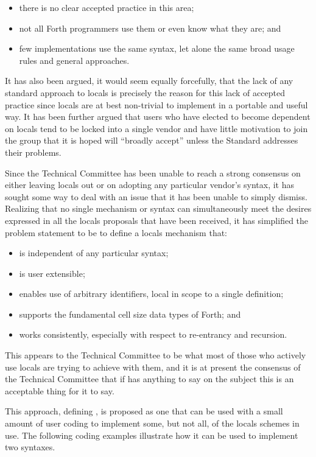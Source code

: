 \begin{itemize}
\item there is no clear accepted practice in this area;
\item not all Forth programmers use them or even know what they are;
	and
\item few implementations use the same syntax, let alone the same
	broad usage rules and general approaches.
\end{itemize}

It has also been argued, it would seem equally forcefully, that the
lack of any standard approach to locals is precisely the reason for
this lack of accepted practice since locals are at best non-trivial
to implement in a portable and useful way. It has been further argued
that users who have elected to become dependent on locals tend to be
locked into a single vendor and have little motivation to join the
group that it is hoped will ``broadly accept''  unless the
Standard addresses their problems.

Since the Technical Committee has been unable to reach a strong
consensus on either leaving locals out or on adopting any particular
vendor's syntax, it has sought some way to deal with an issue that it
has been unable to simply dismiss. Realizing that no single mechanism
or syntax can simultaneously meet the desires expressed in all the
locals proposals that have been received, it has simplified the
problem statement to be to define a locals mechanism that:

\begin{itemize}
\item is independent of any particular syntax;
\item is user extensible;
\item enables use of arbitrary identifiers,
	local in scope to a single definition;
\item supports the fundamental cell size data types of Forth;
	and
\item works consistently, especially with respect to
	re-entrancy and recursion.
\end{itemize}

This appears to the Technical Committee to be what most of those who
actively use locals are trying to achieve with them, and it is at
present the consensus of the Technical Committee that if  has
anything to say on the subject this is an acceptable thing for it to
say.

This approach, defining , is proposed as one that can be
used with a small amount of user coding to implement some, but not all,
of the locals schemes in use. The following coding examples illustrate
how it can be used to implement two syntaxes.

